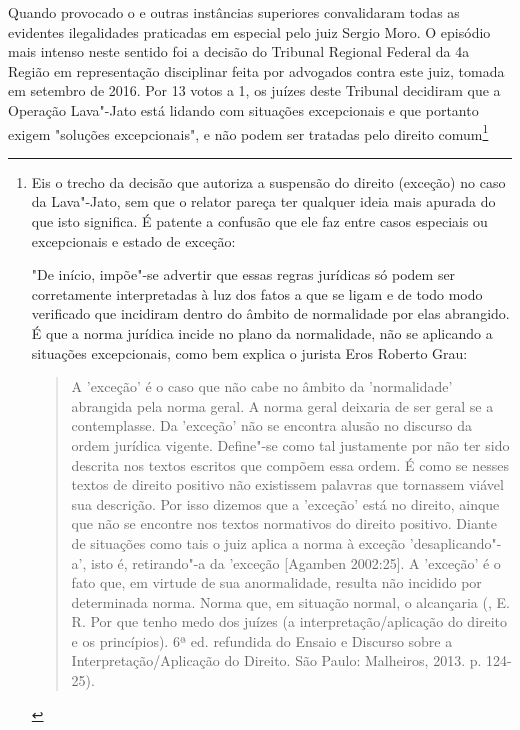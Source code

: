 Quando provocado o  e outras instâncias superiores convalidaram todas
as evidentes ilegalidades praticadas em especial pelo juiz Sergio Moro.
O episódio mais intenso neste sentido foi a decisão do Tribunal Regional
Federal da 4a Região em representação disciplinar feita por advogados
contra este juiz, tomada em setembro de 2016. Por 13 votos a 1, os
juízes deste Tribunal decidiram que a Operação Lava"-Jato está lidando
com situações excepcionais e que portanto exigem "soluções
excepcionais", e não podem ser tratadas pelo direito comum\footnote{Eis
  o trecho da decisão que autoriza a suspensão do direito (exceção) no
  caso da Lava"-Jato, sem que o relator pareça ter qualquer ideia mais
  apurada do que isto significa. É patente a confusão que ele faz entre
  casos especiais ou excepcionais e estado de exceção:

  "De início, impõe"-se advertir que essas regras jurídicas só podem ser
  corretamente interpretadas à luz dos fatos a que se ligam e de todo
  modo verificado que incidiram dentro do âmbito de normalidade por elas
  abrangido. É que a norma jurídica incide no plano da normalidade, não
  se aplicando a situações excepcionais, como bem explica o jurista Eros
  Roberto Grau:

  \begin{quote}
  A 'exceção' é o caso que não cabe no âmbito da 'normalidade' abrangida
  pela norma geral. A norma geral deixaria de ser geral se a
  contemplasse. Da 'exceção' não se encontra alusão no discurso da ordem
  jurídica vigente. Define"-se como tal justamente por não ter sido
  descrita nos textos escritos que compõem essa ordem. É como se nesses
  textos de direito positivo não existissem palavras que tornassem
  viável sua descrição. Por isso dizemos que a 'exceção' está no
  direito, ainque que não se encontre nos textos normativos do direito
  positivo. Diante de situações como tais o juiz aplica a norma à
  exceção 'desaplicando"-a', isto é, retirando"-a da 'exceção {[}Agamben
  2002:25{]}. A 'exceção' é o fato que, em virtude de sua anormalidade,
  resulta não incidido por determinada norma. Norma que, em situação
  normal, o alcançaria (, E. R. Por que tenho medo dos juízes (a
  interpretação/aplicação do direito e os princípios). 6ª ed. refundida
  do Ensaio e Discurso sobre a Interpretação/Aplicação do Direito. São
  Paulo: Malheiros, 2013. p. 124-25).
  \end{quote}

}
